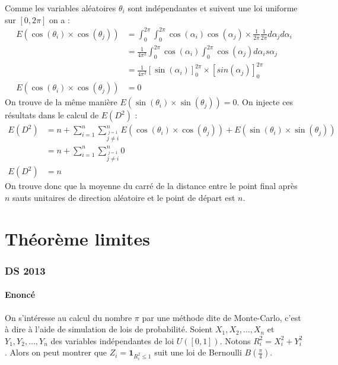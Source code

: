 \documentclass[10pt,a4paper,twoside]{article}
\begin{document}
Comme les variables aléatoires $\theta_{i}$ sont indépendantes et suivent une loi uniforme sur $[0,2\pi]$ on a :
\begin{align*}
E(\cos(\theta_{i}) \times \cos(\theta_{j})) &= \int_{0}^{2\pi}\int_{0}^{2\pi} \cos(\alpha_{i})\cos(\alpha_{j}) \times \frac{1}{2\pi}\frac{1}{2\pi} d\alpha_{j}d\alpha_{i}\\
&= \frac{1}{4\pi^{2}} \int_{0}^{2\pi} \cos(\alpha_{i}) \int_{0}^{2\pi} \cos(\alpha_{j}) d\alpha_{i} s\alpha_{j}\\
&= \frac{1}{4\pi^{2}} [\sin(\alpha_{i})]_{0}^{2\pi} \times [sin(\alpha_{j})]_{0}^{2\pi}\\
E(\cos(\theta_{i}) \times \cos(\theta_{j})) &= 0
\end{align*}
On trouve de la même manière $E(\sin(\theta_{i}) \times \sin(\theta_{j})) = 0$. On injecte ces résultats dans le calcul de $E(D^{2})$ :
\begin{align*}
E(D^{2}) &= n + \sum_{i=1}^{n}\sum_{\overset{j=1}{j\neq i}}^{n} E(\cos(\theta_{i}) \times \cos(\theta_{j})) + E(\sin(\theta_{i}) \times \sin(\theta_{j})) \\
&= n+ \sum_{i=1}^{n}\sum_{\overset{j=1}{j\neq i}}^{n}0\\
E(D^{2}) &= n 
\end{align*}
On trouve donc que la moyenne du carré de la distance entre le point final après $n$ sauts unitaires de direction aléatoire et le point de départ est $n$.

\newpage
\part{Théorème limites}
\setcounter{section}{0}
\section{DS 2013}
\subsection*{Enoncé}
On s'intéresse au calcul du nombre $\pi$ par une méthode dite de Monte-Carlo, c'est à dire à l'aide de simulation de lois de probabilité. Soient $X_{1},X_{2},\ldots,X_{n}$ et $Y_{1},Y_{2},\ldots,Y_{n}$ des variables indépendantes de loi $U([0,1])$. Notons $R_{i}^{2}=X_{i}^{2}+Y_{i}^{2}$. Alors on peut montrer que $Z_{i}=\mathbf{1}_{R^{2}_{i}\leqslant 1}$ suit une loi de Bernoulli $B(\frac{\pi}{4})$.
\end{document}
